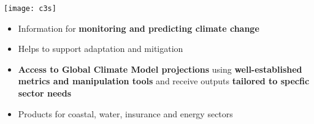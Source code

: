 \documentclass[landscape,a0paper,fontscale=0.4]{baposter} %
\newcommand{\compresslist}{%
\setlength{\itemsep}{1pt}%
\setlength{\parskip}{0pt}%
\setlength{\parsep}{0pt}%
}
\begin{document}
\begin{poster}
{  \texttt{[image: c3s]} \\

  \begin{itemize}\compresslist
    \item Information for {\bf monitoring and predicting climate change}
    \item Helps to support adaptation and mitigation
    \item {\bf Access to Global Climate Model projections} using {\bf well-established
      metrics and manipulation tools} and receive outputs
      {\bf tailored to specfic sector needs}
    \item Products for coastal, water, insurance and energy sectors
  \end{itemize}

}


\end{poster}
\end{document}
